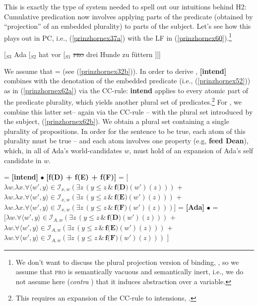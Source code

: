 \documentclass[output=paper,colorlinks,citecolor=brown,
]{langscibook}
\begin{document}
This is exactly the type of system needed to spell out our intuitions behind H2: Cumulative predication now involves applying parts of the predicate (obtained by “projection” of an embedded plurality) to parts of the subject. Let's see how this plays out in PC, i.e., (\ref{prinzhornex37a}) with the LF in (\ref{prinzhornex60}).\footnote{We don't want to discuss the  plural projection version of binding, \citep{Haslinger:2020d}, so we assume that \textsc{pro} is semantically vacuous and semantically inert, i.e., we do not assume here (\textit{contra} \citealt{Heim:1998}) that it induces abstraction over a variable.} 

\ea  \label{prinzhornex60} [$_{S3}$ Ada [$_{S2}$ hat vor [$_{S1}$ \sout{\textsc{pro}} drei Hunde zu füttern ]]]  \z

We assume that  =  (see (\ref{prinzhornex32b})). In order to derive ,  \textbf{[intend]} combines with the denotation of the embedded predicate (i.e., (\ref{prinzhornex52})) as in (\ref{prinzhornex62a}) via the CC-rule: \textbf{intend} applies to every atomic part of the predicate plurality, which yields another plural set of predicates.\footnote{This requires an expansion of the CC-rule to  intensions, \citep{Schmitt:2019a}.} For , we combine this latter set-- again via the CC-rule -- with the plural set introduced by the subject, (\ref{prinzhornex62b}). We obtain a plural set containing a single plurality of propositions. In order for the sentence to be true, each atom of this plurality must be true -- and each atom involves one property (e.g, {\bf feed Dean}), which, in all of Ada's world-candidates $w$, must hold of an expansion of Ada's self candidate in $w$.




\ea
\ea  {} = \textbf{[intend]} $\bullet$ \textbf{[f(D) + f(E) + f(F)]} = 
 [$\lambda w. \lambda x. \forall \langle w' ,y\rangle \in \mathcal{I}_{x,w} (\exists  z \,(y \le z\, \& \,\textbf{f(D)}(w')(z)))$ +
 $\lambda w. \lambda x. \forall \langle w' ,y\rangle \in \mathcal{I}_{x,w} (\exists  z \,(y \le z\, \& \,\textbf{f(E)}(w')(z)))$ +
 $\lambda w. \lambda x. \forall \langle w' ,y \rangle \in \mathcal{I}_{x,w} (\exists  z \,(y \le z\, \& \,\textbf{f(F)}(w')(z)))$]
\label{prinzhornex62a}
\ex {} = \textbf{[Ada]} $\bullet$  = \\
 $[\lambda w.  \forall \langle w' ,y \rangle \in \mathcal{I}_{A,w} (\exists  z \,(y \le z\, \& \,\textbf{f(D)}(w')(z)))$ +
 $\lambda w.  \forall \langle w' ,y\rangle \in \mathcal{I}_{A,w} (\exists  z \,(y \le z\, \& \,\textbf{f(E)}(w')(z)))$ +
 $\lambda w.  \forall \langle w' ,y \rangle \in \mathcal{I}_{A,w} (\exists  z \,(y \le z\, \& \,\textbf{f(F)}(w')(z)))$ ]
\label{prinzhornex62b}
\z\z
\end{document}
